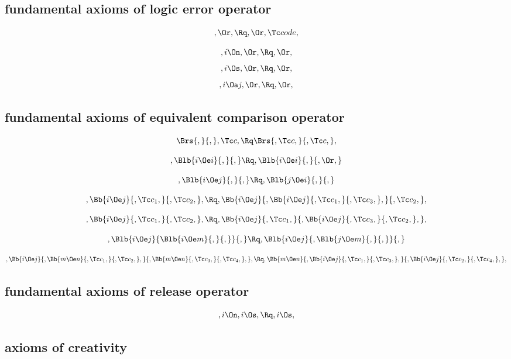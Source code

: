 \bigskip
\subsection{fundamental axioms of logic error operator}

\[,\Or, \Rq ,\Or, \Tc code,\]


\[,i \On, \Or, \Rq ,\Or,\]
\[,i \Os, \Or, \Rq ,\Or,\]
\[,i \Oa j, \Or, \Rq ,\Or,\]



\bigskip
\subsection{ fundamental axioms of equivalent comparison operator}

\[\Brs{,}{,} ,\Tc c, \Rq \Brs{,\Tc c,}{,\Tc c,},\]

\bigskip

\[, \Blb{i \Oe i}{,}{,} \Rq , \Blb{i \Oe i}{,}{, \Or,}\]


\bigskip

\[, \Blb{i \Oe j}{,}{,} \Rq , \Blb{j \Oe i}{,}{,}\]


\bigskip

\[, \Bb{i \Oe j}{,\Tc c_1,}{,\Tc c_2,}, \Rq , \Bb{i \Oe j}{, \Bb{i \Oe j}{,\Tc c_1,}{,\Tc c_3,},}{,\Tc c_2,} ,\]

\bigskip

\[, \Bb{i \Oe j}{,\Tc c_1,}{,\Tc c_2,}, \Rq , \Bb{i \Oe j}{, \Tc c_1,}{,\Bb{i \Oe j}{,\Tc c_3,}{,\Tc c_2,},} ,\]


\bigskip

\[, \Blb{i \Oe j}{ \Blb{i \Oe m}{,}{,}}{,} \Rq , \Blb{i \Oe j}{, \Blb{j \Oe m}{,}{,}}{,} \]


\bigskip
\[, \Bb{i \Oe j}{,\Bb{m \Oe n}{,\Tc c_1,}{,\Tc c_2,},}{, \Bb{m \Oe n}{,\Tc c_3,}{,\Tc c_4,},}, \Rq ,  \Bb{m \Oe n}{,\Bb{i \Oe j}{,\Tc c_1,}{,\Tc c_3,},}{, \Bb{i \Oe j}{,\Tc c_2,}{,\Tc c_4,},},\]


\bigskip
\subsection{fundamental axioms of release operator}

\[,i \On ,i \Os , \Rq ,i \Os,\]



\bigskip
\subsection{ axioms of creativity}

